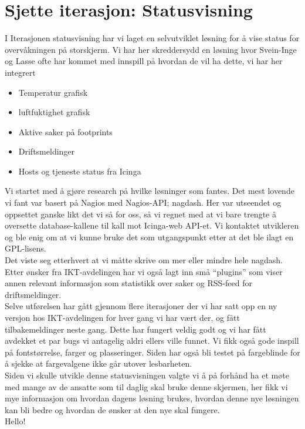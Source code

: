 

\date{Fredag 12. April 2013}



\maketitle
\section*{Sjette iterasjon: Statusvisning}


\noindent I Iterasjonen statusvisning har vi laget en selvutviklet løsning for å vise status for overvåkningen på storskjerm. Vi har her skreddersydd en løsning hvor Svein-Inge og Lasse ofte har kommet med innspill på hvordan de vil ha dette, vi har her integrert\\

\begin{itemize}
	\item Temperatur grafisk
	\item luftfuktighet grafisk
	\item Aktive saker på footprints
	\item Driftsmeldinger
	\item Hosts og tjeneste status fra Icinga
\end{itemize}

\noindent Vi startet med å gjøre research på hvilke løsninger som fantes. Det mest lovende vi fant var basert på Nagios med Nagios-API; nagdash. Her var utseendet og oppsettet ganske likt det vi så for oss, så vi regnet med at vi bare trengte å oversette database-kallene til kall mot Icinga-web API-et. Vi kontaktet utvikleren og ble enig om at vi kunne bruke det som utgangspunkt etter at det ble ilagt en GPL-lisens.\\

\noindent Det viste seg etterhvert at vi måtte skrive om mer eller mindre hele nagdash. Etter ønsker fra IKT-avdelingen har vi også lagt inn små “plugins” som viser annen relevant informasjon som statistikk over saker og RSS-feed for driftsmeldinger.\\

\noindent Selve utførelsen har gått gjennom flere iterasjoner der vi har satt opp en ny versjon hos IKT-avdelingen for hver gang vi har vært der, og fått tilbakemeldinger neste gang. Dette har fungert veldig godt og vi har fått avdekket et par bugs vi antagelig aldri ellers ville funnet. Vi fikk også gode inspill på fontstørrelse, farger og plasseringer. Siden har også bli testet på fargeblinde for å sjekke at fargevalgene ikke går utover lesbarheten.\\

\noindent Siden vi skulle utvikle denne statusvisningen valgte vi å på forhånd ha et møte med mange av de ansatte som til daglig skal bruke denne skjermen, her fikk vi mye informasjon om hvordan dagens løsning brukes, hvordan denne nye løsningen kan bli bedre og hvordan de ønsker at den nye skal fungere.\\
\noindent Hello!


